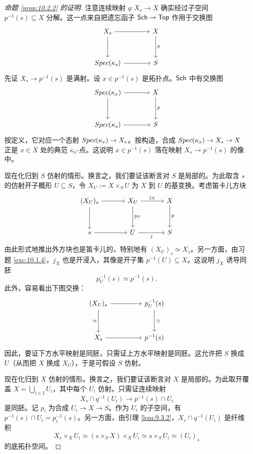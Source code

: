 \begin{proof}[命题 \ref{prop:10.2.2} 的证明]
注意连续映射 $q \colon X_s \to X$ 确实经过子空间 $p^{-1}(s) \subseteq X$ 分解。这一点来自把遗忘函子 $\mathsf{Sch} \to \mathsf{Top}$ 作用于交换图
\[
\begin{tikzcd}[column sep=3.8em,row sep=3em]
X_s \arrow[r] \arrow[d] & X \arrow[d,"p"]\\
\Spec(\kappa_s) \arrow[r] & S
\end{tikzcd}
\]
先证 $X_s \to p^{-1}(s)$ 是满射。设 $x \in p^{-1}(s)$ 是拓扑点。$\mathsf{Sch}$ 中有交换图
\[
\begin{tikzcd}[column sep=3.8em,row sep=3em]
\Spec(\kappa_x) \arrow[r] \arrow[d] & X \arrow[d,"p"]\\
\Spec(\kappa_s) \arrow[r] & S
\end{tikzcd}
\]
按定义，它对应一个态射 $Spec(\kappa_x) \to X_s$。按构造，合成 $Spec(\kappa_x) \to X_s \to X$ 正是 $x \in X$ 处的典范 $\kappa_x$-点。这说明 $x \in p^{-1}(s)$ 落在映射 $X_s \to p^{-1}(s)$ 的像中。

现在化归到 $S$ 仿射的情形。换言之，我们要证该断言对 $S$ 是局部的。为此取含 $s$ 的仿射开子概形 $U \subseteq S$，令 $X_U := X \times_S U$ 为 $X$ 到 $U$ 的基变换。考虑笛卡儿方块
\[
\begin{tikzcd}[column sep=3.4em,row sep=3em]
(X_U)_s \arrow[r] \arrow[d] & X_U \arrow[r,"j_X"] \arrow[d,"p_U"] & X \arrow[d,"p"]\\
s \arrow[r] & U \arrow[r,"j"'] & S
\end{tikzcd}
\]
由此形式地推出外方块也是笛卡儿的，特别地有 $(X_U)_s \simeq X_s$。另一方面，由习题 \ref{exc:10.1.4}，$j_X$ 也是开浸入，其像是开子集 $p^{-1}(U) \subseteq X$。这说明 $j_X$ 诱导同胚
\[
p_U^{-1}(s) \simeq p^{-1}(s).
\]
此外，容易看出下图交换：
\[
\begin{tikzcd}[column sep=4.6em,row sep=3.2em]
(X_U)_s \arrow[r] \arrow[d,"\simeq"'] & p_U^{-1}(s) \arrow[d,"\simeq"]\\
X_s \arrow[r] & p^{-1}(s)
\end{tikzcd}
\]
因此，要证下方水平映射是同胚，只需证上方水平映射是同胚。这允许把 $S$ 换成 $U$（从而把 $X$ 换成 $X_U$），于是可假设 $S$ 仿射。

现在化归到 $X$ 仿射的情形。换言之，我们要证该断言对 $X$ 是局部的。为此取开覆盖 $X = \bigcup_{i \in I} U_i$，其中每个 $U_i$ 仿射。只需证连续映射
\[
X_s \cap q^{-1}(U_i) \longrightarrow p^{-1}(s) \cap U_i
\]
是同胚。记 $p_i$ 为合成 $U_i \to X \to S$。作为 $U_i$ 的子空间，有 $p^{-1}(s) \cap U_i = p_i^{-1}(s)$。另一方面，由引理 \ref{lem:9.3.2}，$X_s \cap q^{-1}(U_i)$ 是纤维积
\[
X_s \times_X U_i \simeq (s \times_S X) \times_X U_i \simeq s \times_S U_i \simeq (U_i)_s
\]
的底拓扑空间。


\end{proof}
